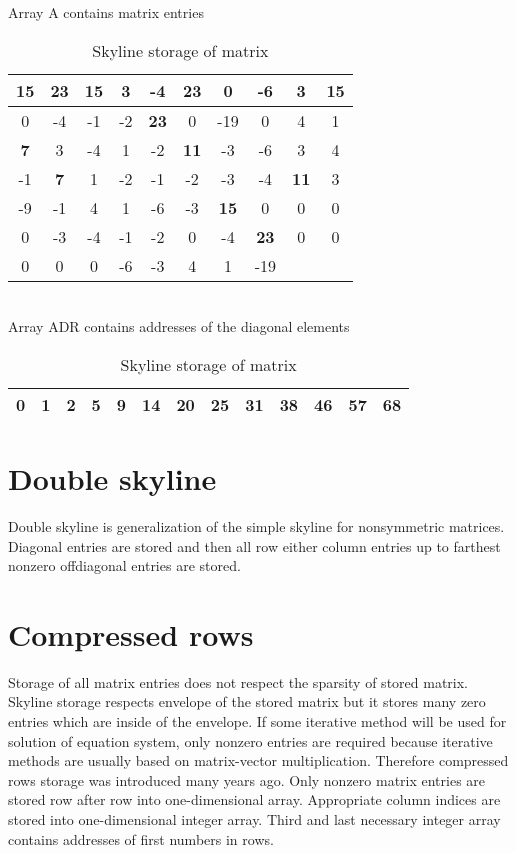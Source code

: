 \begin{table}[tbh]
\begin{center}
Array A contains matrix entries
\\[3mm]
\begin{tabular}{|c|c|c|c|c|c|c|c|c|c|}
\hline
 {\bf 15} & {\bf 23} &  {\bf 15} &   3 &  -4 & {\bf 23} &   0 &  -6 &   3 & {\bf 15}
\\ \hline
   0 &  -4 &  -1 &  -2 & {\bf 23} &   0 & -19 &   0 &   4 &   1 
\\ \hline
 {\bf 7} &   3 &  -4 &   1 &  -2 & {\bf 11} &  -3 &  -6 &   3 &   4 
\\ \hline
  -1 &  {\bf 7} &   1 &  -2 &  -1 &  -2 &  -3 &  -4 & {\bf 11} &   3 
\\ \hline
  -9 &  -1 &   4 &   1 &  -6 &  -3 & {\bf 15} &   0 &   0 &   0 
\\ \hline
   0 &  -3 &  -4 &  -1 &  -2 &   0 &  -4 & {\bf 23} &   0 &   0 
\\ \hline
   0 &   0 &   0 &  -6 &  -3 &   4 &   1 & -19 & \multicolumn{2}{c}{}
\\ \cline{1-8}
\end{tabular}
\\[5mm]
Array ADR contains addresses of the diagonal elements
\\[3mm]
\begin{tabular}{|c|c|c|c|c|c|c|c|c|c|c|c|c|}
\hline
0 & 1 & 2 & 5 & 9 & 14 & 20 & 25 & 31 & 38 & 46 & 57 & 68
\\ \hline
\end{tabular}
\caption{Skyline storage of matrix}
\label{tabskymat}
\end{center}
\end{table}

\section{Double skyline}
\label{sectdoubleskylinestor}

Double skyline is generalization of the simple skyline for nonsymmetric matrices.
Diagonal entries are stored and then all row either column entries up to farthest
nonzero offdiagonal entries are stored.

\section{Compressed rows}
\label{sectcrstor}

Storage of all matrix entries does not respect the sparsity of stored matrix. Skyline storage
respects envelope of the stored matrix but it stores many zero entries which are inside of the envelope.
If some iterative method will be used for solution of equation system, only nonzero entries are required
because iterative methods are usually based on matrix-vector multiplication. Therefore compressed rows
storage was introduced many years ago. Only nonzero matrix entries are stored row after row into
one-dimensional array. Appropriate column indices are stored into one-dimensional integer array. Third
and last necessary integer array contains addresses of first numbers in rows.

